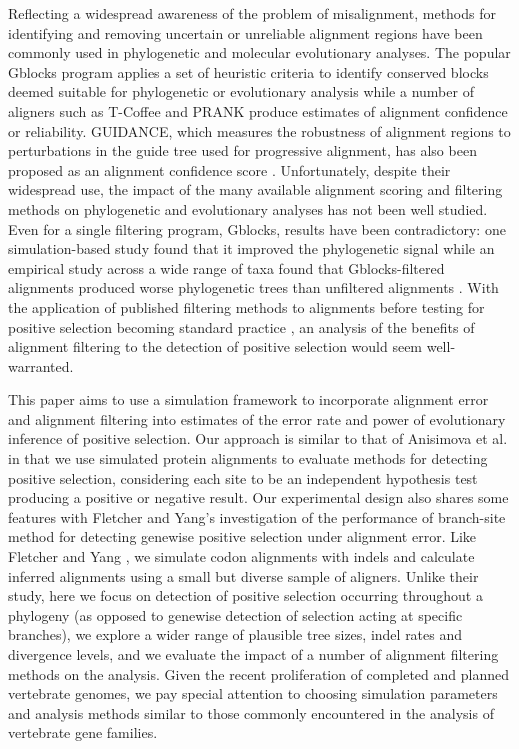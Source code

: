 \documentclass{article}
\begin{document}
Reflecting a widespread awareness of the problem of misalignment,
methods for identifying and removing uncertain or unreliable alignment
regions have been commonly used in phylogenetic and molecular
evolutionary analyses. The popular Gblocks program applies a set of
heuristic criteria to identify conserved blocks deemed suitable for
phylogenetic or evolutionary analysis \citep{Castresana2000Selection}
while a number of aligners such as T-Coffee
\citep{Notredame2000TCoffee} and PRANK
\citep{Loytynoja2008PhylogenyAware} produce estimates of alignment
confidence or reliability. GUIDANCE, which measures the robustness of
alignment regions to perturbations in the guide tree used for
progressive alignment, has also been proposed as an alignment
confidence score \citep{Penn2010Alignment}. Unfortunately, despite
their widespread use, the impact of the many available alignment
scoring and filtering methods on phylogenetic and evolutionary
analyses has not been well studied. Even for a single filtering
program, Gblocks, results have been contradictory: one
simulation-based study found that it improved the phylogenetic signal
\citep{Talavera2007Improvement} while an empirical study across a wide
range of taxa found that Gblocks-filtered alignments produced worse
phylogenetic trees than unfiltered alignments
\citep{Dessimoz2010Phylogenetic}. With the application of published
filtering methods to alignments before testing for positive selection
becoming standard practice
\citep{Studer2008Pervasive,Aguileta2009Rapidly}, an analysis of the
benefits of alignment filtering to the detection of positive selection
would seem well-warranted.

This paper aims to use a simulation framework to incorporate alignment
error and alignment filtering into estimates of the error rate and
power of \sw evolutionary inference of positive selection. Our
approach is similar to that of Anisimova et al.
\citeyearpar{Anisimova2002Accuracy} in that we use simulated protein
alignments to evaluate methods for detecting \sw positive selection,
considering each site to be an independent hypothesis test producing a
positive or negative result. Our experimental design also shares some
features with Fletcher and Yang's \citeyearpar{Fletcher2010Effect}
investigation of the performance of branch-site method for detecting
genewise positive selection under alignment error. Like Fletcher and
Yang \citeyearpar{Fletcher2010Effect}, we simulate codon alignments
with indels and calculate inferred alignments using a small but
diverse sample of aligners. Unlike their study, here we focus on \sw
detection of positive selection occurring throughout a phylogeny (as
opposed to genewise detection of selection acting at specific
branches), we explore a wider range of plausible tree sizes, indel
rates and divergence levels, and we evaluate the impact of a number of
alignment filtering methods on the \sw analysis. Given the recent
proliferation of completed and planned vertebrate genomes, we pay
special attention to choosing simulation parameters and analysis
methods similar to those commonly encountered in the \sw analysis of
vertebrate gene families.
\end{document}
